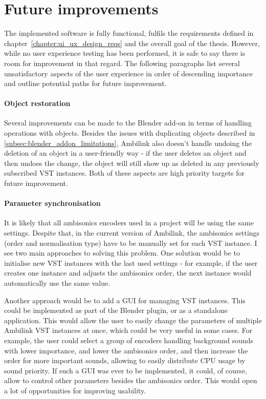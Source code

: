 \section{Future improvements}
The implemented software is fully functional, fulfils the requirements defined in chapter~\ref{chapter:ui_ux_design_reqs}
and the overall goal of the thesis.
However, while no user experience testing has been performed, it is safe to say there is room for improvement in 
that regard. The following paragraphs list several unsatisfactory aspects of the user experience in order of 
descending importance and outline potential paths for future improvement.

\paragraph*{Object restoration}
Several improvements can be made to the Blender add-on in terms of handling operations with objects.
Besides the issues with duplicating objects described in \ref{subsec:blender_addon_limitations}, 
Ambilink also doesn't handle undoing the deletion of an object in a user-friendly way - if the 
user deletes an object and then undoes the change, the object will still show up as deleted in any 
previously subscribed VST instances. Both of these aspects are high priority 
targets for future improvement.

\paragraph*{Parameter synchronisation}
It is likely that all ambisonics encoders used in a project will be using the same settings. 
Despite that, in the current version of Ambilink, the ambisonics settings
(order and normalisation type) have to be manually set for each VST instance.
I see two main approaches to solving this problem. 
One solution would be to initialise new VST instances with the last used settings - for example, 
if the user creates one instance and adjusts the ambisonics order, 
the next instance would automatically use the same value.

Another approach would be to add a GUI for managing VST instances.
This could be implemented as part of the Blender plugin, or as a standalone application.
This would allow the user to easily change the parameters of multiple Ambilink VST instances at 
once, which could be very useful in some cases. For example, the user could select a group of 
encoders handling background sounds with lower importance, and lower the ambisonics 
order, and then increase the order for more important sounds, allowing to easily 
distribute CPU usage by sound priority. If such a GUI was ever to be implemented, 
it could, of course, allow to control other parameters besides the ambisonics order. 
This would open a lot of opportunities for improving usability.

